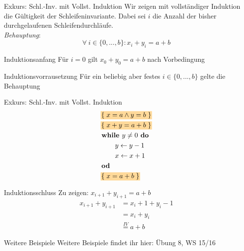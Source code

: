 \begin{frame}{Exkurs: Schl.-Inv. mit Vollst. Induktion}
	Wir zeigen mit vollständiger Induktion die Gültigkeit der Schleifeninvariante. Dabei sei $i$ die Anzahl der bisher durchgelaufenen Schleifendurchläufe.\\
	
	\emph{Behauptung}: $$ \forall\ i \in \{0,...,b\} : x_i + y_i = a+b $$ \pause
	\begin{block}{Induktionsanfang}
		Für $i=0$ gilt $ x_0+y_0 = a+b $ nach Vorbedingung
	\end{block} \pause 
	\begin{block}{Induktionsvorrausetzung}
		Für ein beliebig aber festes $i\in \{0,...,b\}$ gelte die Behauptung
	\end{block}
\end{frame}

\begin{frame}{Exkurs: Schl.-Inv. mit Vollst. Induktion}
	\vspace{-2\baselineskip}
	\begin{align*}
	&\assert{x=a \land y=b}  \\
	&\assert{ x+y=a+b }\\
	&\kw{while } y\not=0 \kw{ do } \\
	&\qquad y \gets y-1 \\
	&\qquad x \gets x+1 \\
	&\kw{od } \\
	&\assert{x=a+b} \\
	\end{align*}
	\vspace{-2\baselineskip}
	\begin{block}{Induktionsschluss}
		Zu zeigen: $ x_{i+1} + y_{i+1} = a+b $ \pause
		\begin{align*}
		x_{i+1}+y_{i+1} &= x_i +1 + y_i -1 \\
		&= x_i + y_i \\
		&\overset{IV}{=} a+b
		\end{align*}
	\end{block}
\end{frame}

\begin{frame} {Weitere Beispiele}
	Weitere Beispiele findet ihr hier: Übung 8, WS 15/16
\end{frame}